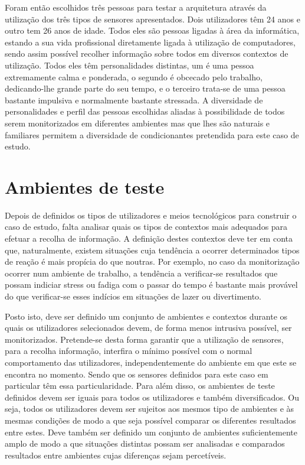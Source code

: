 Foram então escolhidos três pessoas para testar a arquitetura através da utilização dos três tipos de sensores apresentados. Dois utilizadores têm 24 anos e outro tem 26 anos de idade. Todos eles são pessoas ligadas à área da informática, estando a sua vida profissional diretamente ligada à utilização de computadores, sendo assim possível recolher informação sobre todos em diversos contextos de utilização. Todos eles têm personalidades distintas, um é uma pessoa extremamente calma e ponderada, o segundo é obcecado pelo trabalho, dedicando-lhe grande parte do seu tempo, e o terceiro trata-se de uma pessoa bastante impulsiva e normalmente bastante stressada. A diversidade de personalidades e perfil das pessoas escolhidas aliadas à possibilidade de todos serem monitorizados em diferentes ambientes mas que lhes são naturais e familiares permitem a diversidade de condicionantes pretendida para este caso de estudo.


\section{Ambientes de teste}

Depois de definidos os tipos de utilizadores e meios tecnológicos para construir o caso de estudo, falta analisar quais os tipos de contextos mais adequados para efetuar a recolha de informação. A definição destes contextos deve ter em conta que, naturalmente, existem situações cuja tendência a ocorrer determinados tipos de reação é mais propícia do que noutras. Por exemplo, no caso da monitorização ocorrer num ambiente de trabalho, a tendência a verificar-se resultados que possam indiciar stress ou fadiga com o passar do tempo é bastante mais provável do que verificar-se esses indícios em situações de lazer ou divertimento.

Posto isto, deve ser definido um conjunto de ambientes e contextos durante os quais os utilizadores selecionados devem, de forma menos intrusiva possível, ser monitorizados. Pretende-se desta forma garantir que a utilização de sensores, para a recolha informação, interfira o mínimo possível com o normal comportamento das utilizadores, independentemente do ambiente em que este se encontra no momento. Sendo que os sensores definidos para este caso em particular têm essa particularidade. Para além disso, os ambientes de teste definidos devem ser iguais para todos os utilizadores e também diversificados. Ou seja, todos os utilizadores devem ser sujeitos aos mesmos tipo de ambientes e às mesmas condições de modo a que seja possível comparar os diferentes resultados entre estes. Deve também ser definido um conjunto de ambientes suficientemente amplo de modo a que situações distintas possam ser analisadas e comparados resultados entre ambientes cujas diferenças sejam percetíveis.

